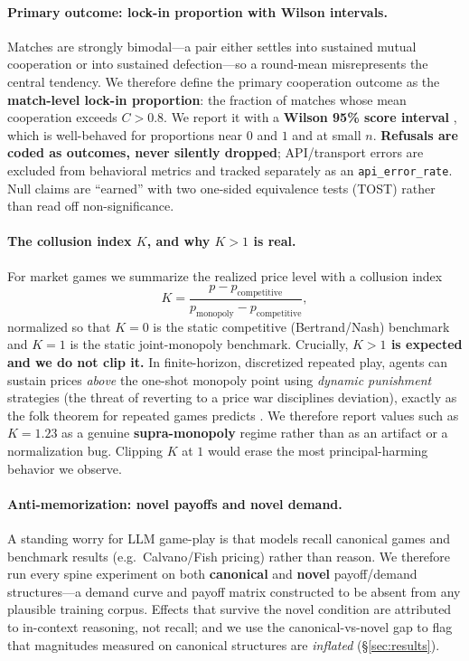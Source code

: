 \paragraph{Primary outcome: lock-in proportion with Wilson intervals.}
Matches are strongly bimodal---a pair either settles into sustained mutual cooperation or
into sustained defection---so a round-mean misrepresents the central tendency. We therefore
define the primary cooperation outcome as the \textbf{match-level lock-in proportion}: the
fraction of matches whose mean cooperation exceeds $C>0.8$. We report it with a
\textbf{Wilson 95\% score interval} \citep{wilson1927probable}, which is well-behaved for
proportions near $0$ and $1$ and at small $n$. \textbf{Refusals are coded as outcomes,
never silently dropped}; API/transport errors are excluded from behavioral metrics and
tracked separately as an \texttt{api\_error\_rate}. Null claims are ``earned'' with two
one-sided equivalence tests (TOST) \citep{lakens2017tost,lakens2018equivalence} rather than
read off non-significance.

\paragraph{The collusion index $K$, and why $K>1$ is real.}
For market games we summarize the realized price level with a collusion index
\[
K = \frac{p - p_{\text{competitive}}}{p_{\text{monopoly}} - p_{\text{competitive}}},
\]
normalized so that $K{=}0$ is the static competitive (Bertrand/Nash) benchmark and
$K{=}1$ is the static joint-monopoly benchmark. Crucially, \textbf{$K>1$ is expected and we
do not clip it.} In finite-horizon, discretized repeated play, agents can sustain prices
\emph{above} the one-shot monopoly point using \emph{dynamic punishment} strategies (the
threat of reverting to a price war disciplines deviation), exactly as the folk theorem for
repeated games predicts \citep{friedman1971noncooperative,fudenberg1986folk}. We therefore report values such as $K{=}1.23$ as a genuine
\textbf{supra-monopoly} regime rather than as an artifact or a normalization bug. Clipping
$K$ at $1$ would erase the most principal-harming behavior we observe.

\paragraph{Anti-memorization: novel payoffs and novel demand.}
A standing worry for LLM game-play is that models recall canonical games and benchmark
results (e.g.\ Calvano/Fish pricing) rather than reason. We therefore run every spine
experiment on both \textbf{canonical} and \textbf{novel} payoff/demand structures---a
demand curve and payoff matrix constructed to be absent from any plausible training
corpus. Effects that survive the novel condition are attributed to in-context reasoning,
not recall; and we use the canonical-vs-novel gap to flag that magnitudes measured on
canonical structures are \emph{inflated} (\S\ref{sec:results}).


